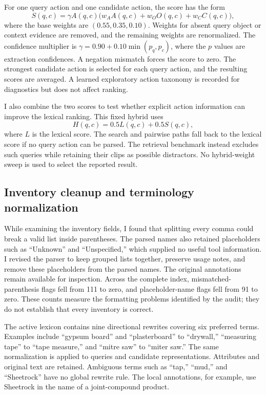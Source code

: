 \documentclass[11pt,letterpaper]{article}
\begin{document}
For one query action and one candidate action, the score has the form
\begin{equation}\label{eq:structured}
 S(q,c)=\gamma A(q,c)
       \bigl(w_A A(q,c)+w_O O(q,c)+w_C C(q,c)\bigr),
\end{equation}
where the base weights are $(0.55,0.35,0.10)$. Weights for absent query object
or context evidence are removed, and the remaining weights are renormalized.
The confidence multiplier is $\gamma=0.90+0.10\min(p_q,p_c)$, where the $p$
values are extraction confidences. A negation mismatch forces the score to
zero. The strongest candidate action is selected for each query action, and
the resulting scores are averaged. A learned exploratory action taxonomy is
recorded for diagnostics but does not affect ranking.

I also combine the two scores to test whether explicit action information
can improve the lexical ranking. This fixed hybrid uses
\begin{equation}
 H(q,c)=0.5L(q,c)+0.5S(q,c),
\end{equation}
where $L$ is the lexical score. The search and pairwise paths fall back to the
lexical score if no query action can be parsed. The retrieval benchmark instead
excludes such queries while retaining their clips as possible distractors.
No hybrid-weight sweep is used to select the reported result.

\subsection{Inventory cleanup and terminology normalization}
While examining the inventory fields, I found that splitting every comma
could break a valid list inside parentheses. The parsed names also retained
placeholders such as ``Unknown'' and ``Unspecified,'' which supplied no useful
tool information. I revised the parser to keep grouped lists together,
preserve usage notes, and remove these placeholders from the parsed names.
The original annotations remain available for inspection. Across the complete
index, mismatched-parenthesis flags fell from 111 to zero, and placeholder-name
flags fell from 91 to zero. These counts measure the formatting problems
identified by the audit; they do not establish that every inventory is correct.

The active lexicon contains nine directional rewrites covering six preferred
terms. Examples include ``gypsum board'' and ``plasterboard'' to ``drywall,''
``measuring tape'' to ``tape measure,'' and ``mitre saw'' to ``miter saw.''
The same normalization is applied to queries and candidate representations.
Attributes and original text are retained. Ambiguous terms such as ``tap,''
``mud,'' and ``Sheetrock'' have no global rewrite rule. The local annotations,
for example, use Sheetrock in the name of a joint-compound product.
\end{document}
